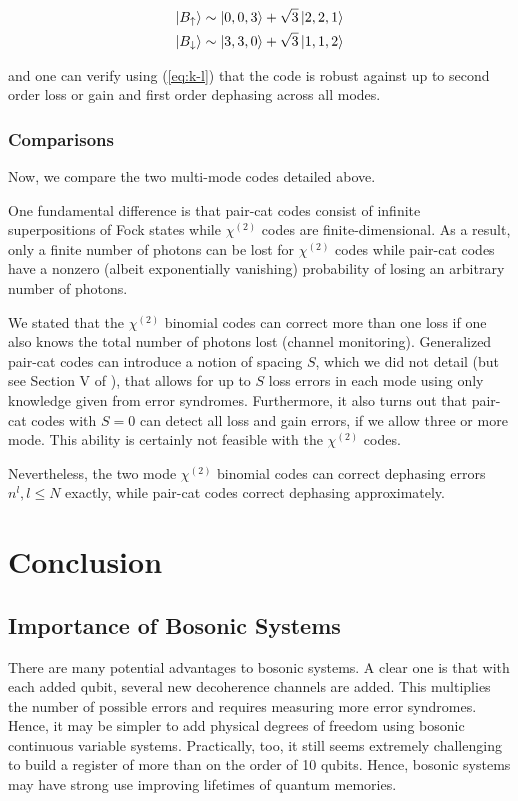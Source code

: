 \documentclass[12]{amsart}
\newcommand\0{\mathbf{0}}
\newcommand\<{\langle}
\renewcommand\>{\rangle}
\begin{document}
\begin{align*}
	\ket{B_{\uparrow}} &\sim \ket{0, 0, 3} + \sqrt{3}\ket{2, 2, 1}\\
	\ket{B_{\downarrow}} &\sim \ket{3, 3, 0} + \sqrt{3}\ket{1, 1, 2}
\end{align*}

and one can verify using (\ref{eq:k-l}) that the code is robust against up to second order loss or gain and first order dephasing across all modes.

\subsubsection{Comparisons}

Now, we compare the two multi-mode codes detailed above.

One fundamental difference is that pair-cat codes consist of infinite superpositions of Fock states while $\chi^{(2)}$ codes are finite-dimensional. As a result, only a finite number of photons can be lost for $\chi^{(2)}$ codes while pair-cat codes have a nonzero (albeit exponentially vanishing) probability of losing an arbitrary number of photons. 

We stated that the $\chi^{(2)}$ binomial codes can correct more than one loss if one also knows the total number of photons lost (channel monitoring). Generalized pair-cat codes can introduce a notion of spacing $S$, which we did not detail (but see Section V of \cite{albert2018multimode}), that allows for up to $S$ loss errors in each mode using only knowledge given from error syndromes. Furthermore, it also turns out that pair-cat codes with $S=0$ can detect all loss and gain errors, if we allow three or more mode\cite{albert2018multimode}. This ability is certainly not feasible with the $\chi^{(2)}$ codes.

Nevertheless, the two mode $\chi^{(2)}$ binomial codes can correct dephasing errors $n^l, l \leq N$ exactly, while pair-cat codes correct dephasing approximately.

\section{Conclusion}

\subsection{Importance of Bosonic Systems}

There are many potential advantages to bosonic systems. A clear one is that with each added qubit, several new decoherence channels are added. This multiplies the number of possible errors and requires measuring more error syndromes. Hence, it may be simpler to add physical degrees of freedom using bosonic continuous variable systems. Practically, too, it still seems extremely challenging to build a register of more than on the order of 10 qubits. Hence, bosonic systems may have strong use improving lifetimes of quantum memories.
\end{document}
